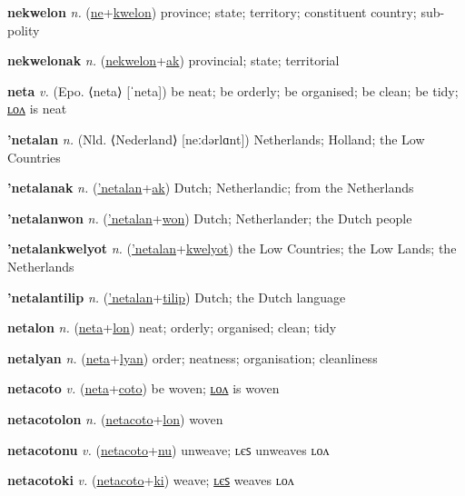 \textbf{\hypertarget{nekwelon}{nekwelon}} \textit{n.} (\hyperlink{ne}{ne}+\allowbreak \hyperlink{kwelon}{kwelon})
province; state; territory; constituent country; sub-polity

\textbf{\hypertarget{nekwelonak}{nekwelonak}} \textit{n.} (\hyperlink{nekwelon}{nekwelon}+\allowbreak \hyperlink{ak}{ak})
provincial; state; territorial

\textbf{\hypertarget{neta}{neta}} \textit{v.} (Epo. ⟨neta⟩ [ˈneta])
be neat; be orderly; be organised; be clean; be tidy; \hyperlink{netalon}{ʟᴏᴧ} is neat

\textbf{\hypertarget{'netalan}{'netalan}} \textit{n.} (Nld. ⟨Nederland⟩ [neːdərlɑnt])
Netherlands; Holland; the Low Countries

\textbf{\hypertarget{'netalanak}{'netalanak}} \textit{n.} (\hyperlink{'netalan}{'netalan}+\allowbreak \hyperlink{ak}{ak})
Dutch; Netherlandic; from the Netherlands

\textbf{\hypertarget{'netalanwon}{'netalanwon}} \textit{n.} (\hyperlink{'netalan}{'netalan}+\allowbreak \hyperlink{won}{won})
Dutch; Netherlander; the Dutch people

\textbf{\hypertarget{'netalankwelyot}{'netalankwelyot}} \textit{n.} (\hyperlink{'netalan}{'netalan}+\allowbreak \hyperlink{kwelyot}{kwelyot})
the Low Countries; the Low Lands; the Netherlands

\textbf{\hypertarget{'netalantilip}{'netalantilip}} \textit{n.} (\hyperlink{'netalan}{'netalan}+\allowbreak \hyperlink{tilip}{tilip})
Dutch; the Dutch language

\textbf{\hypertarget{netalon}{netalon}} \textit{n.} (\hyperlink{neta}{neta}+\allowbreak \hyperlink{lon}{lon})
neat; orderly; organised; clean; tidy

\textbf{\hypertarget{netalyan}{netalyan}} \textit{n.} (\hyperlink{neta}{neta}+\allowbreak \hyperlink{lyan}{lyan})
order; neatness; organisation; cleanliness

\textbf{\hypertarget{netacoto}{netacoto}} \textit{v.} (\hyperlink{neta}{neta}+\allowbreak \hyperlink{coto}{coto})
be woven; \hyperlink{netacotolon}{ʟᴏᴧ} is woven

\textbf{\hypertarget{netacotolon}{netacotolon}} \textit{n.} (\hyperlink{netacoto}{netacoto}+\allowbreak \hyperlink{lon}{lon})
woven

\textbf{\hypertarget{netacotonu}{netacotonu}} \textit{v.} (\hyperlink{netacoto}{netacoto}+\allowbreak \hyperlink{nu}{nu})
unweave; ʟєꜱ unweaves ʟᴏᴧ

\textbf{\hypertarget{netacotoki}{netacotoki}} \textit{v.} (\hyperlink{netacoto}{netacoto}+\allowbreak \hyperlink{ki}{ki})
weave; \hyperlink{netacotokiles}{ʟєꜱ} weaves ʟᴏᴧ


